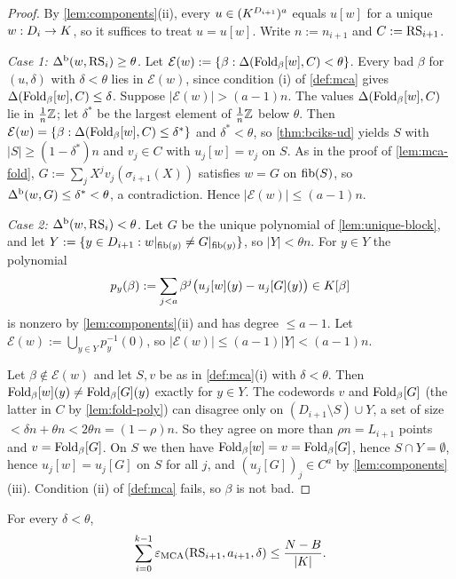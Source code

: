 \begin{proof}
By \cref{lem:components}(ii), every $u\in(K^{D_{i+1}})^a$ equals $u[w]$ for a unique
$w:D_i\to K$, so it suffices to treat $u=u[w]$. Write $n:=n_{i+1}$ and
$C:=\mathrm{RS}_{i+1}$.

\emph{Case 1: $\Delta^{\mathrm{b}}(w,\mathrm{RS}_i)\ge\theta$.} Let $\mathcal E(w):=\{\beta:\Delta(\mathrm{Fold}_\beta[w],C)<\theta\}$.
Every bad $\beta$ for $(u,\delta)$ with $\delta<\theta$ lies in $\mathcal E(w)$, since
condition (i) of \cref{def:mca} gives $\Delta(\mathrm{Fold}_\beta[w],C)\le\delta$. Suppose
$|\mathcal E(w)|>(a-1)n$. The values $\Delta(\mathrm{Fold}_\beta[w],C)$ lie in
$\frac1n\mathbb{Z}$; let $\delta^\ast$ be the largest element of $\frac1n\mathbb{Z}$ below $\theta$. Then
$\mathcal E(w)=\{\beta:\Delta(\mathrm{Fold}_\beta[w],C)\le\delta^\ast\}$ and $\delta^\ast<\theta$,
so \cref{thm:bciks-ud} yields $S$ with $|S|\ge(1-\delta^\ast)n$ and $v_j\in C$ with
$u_j[w]=v_j$ on $S$. As in the proof of \cref{lem:mca-fold}, $G:=\sum_jX^jv_j(\sigma_{i+1}(X))$
satisfies $w=G$ on $\mathrm{fib}(S)$, so $\Delta^{\mathrm{b}}(w,G)\le\delta^\ast<\theta$, a contradiction. Hence
$|\mathcal E(w)|\le(a-1)n$.

\emph{Case 2: $\Delta^{\mathrm{b}}(w,\mathrm{RS}_i)<\theta$.} Let $G$ be the unique polynomial of
\cref{lem:unique-block}, and let $Y:=\{y\in D_{i+1}: w|_{\mathrm{fib}(y)}\ne G|_{\mathrm{fib}(y)}\}$, so
$|Y|<\theta n$. For $y\in Y$ the polynomial
\[
p_y(\beta):=\sum_{j<a}\beta^j\bigl(u_j[w](y)-u_j[G](y)\bigr)\in K[\beta]
\]
is nonzero by \cref{lem:components}(ii) and has degree $\le a-1$. Let
$\mathcal E(w):=\bigcup_{y\in Y}p_y^{-1}(0)$, so $|\mathcal E(w)|\le(a-1)|Y|<(a-1)n$.

Let $\beta\notin\mathcal E(w)$ and let $S,v$ be as in \cref{def:mca}(i) with
$\delta<\theta$. Then $\mathrm{Fold}_\beta[w](y)\ne\mathrm{Fold}_\beta[G](y)$ exactly for $y\in Y$.
The codewords $v$ and $\mathrm{Fold}_\beta[G]$ (the latter in $C$ by \cref{lem:fold-poly})
can disagree only on $(D_{i+1}\setminus S)\cup Y$, a set of size
$<\delta n+\theta n<2\theta n=(1-\rho)n$. So they agree on more than $\rho n=L_{i+1}$
points and $v=\mathrm{Fold}_\beta[G]$. On $S$ we then have
$\mathrm{Fold}_\beta[w]=v=\mathrm{Fold}_\beta[G]$, hence $S\cap Y=\emptyset$, hence
$u_j[w]=u_j[G]$ on $S$ for all $j$, and $(u_j[G])_j\in C^a$ by \cref{lem:components}(iii).
Condition (ii) of \cref{def:mca} fails, so $\beta$ is not bad.
\end{proof}

\begin{corollary}\label{cor:mca-ud-sum}
For every $\delta<\theta$,
\[
\sum_{i=0}^{k-1}\varepsilon_{\mathrm{MCA}}(\mathrm{RS}_{i+1},a_{i+1},\delta)\le\frac{N-B}{|K|}.
\]
\end{corollary}

